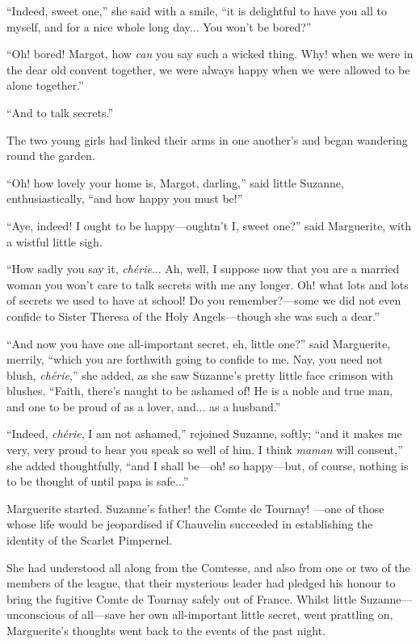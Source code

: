 \enquote{Indeed, sweet one,} she said with a smile, \enquote{it is delightful to have you all to myself, and for a nice whole long day... You won't be bored?}

\enquote{Oh! bored! Margot, how \textit{can} you say such a wicked thing. Why! when we were in the dear old convent together, we were always happy when we were allowed to be alone together.}

\enquote{And to talk secrets.}

The two young girls had linked their arms in one another's and began wandering round the garden.

\enquote{Oh! how lovely your home is, Margot, darling,} said little Suzanne, enthusiastically, \enquote{and how happy you must be!}

\enquote{Aye, indeed! I ought to be happy---oughtn't I, sweet one?} said Marguerite, with a wistful little sigh.

\enquote{How sadly you say it, \textit{chérie}... Ah, well, I suppose now that you are a married woman you won't care to talk secrets with me any longer. Oh! what lots and lots of secrets we used to have at school! Do you remember?---some we did not even confide to Sister Theresa of the Holy Angels---though she was such a dear.}

\enquote{And now you have one all-important secret, eh, little one?} said Marguerite, merrily, \enquote{which you are forthwith going to confide to me. Nay, you need not blush, \textit{chérie},} she added, as she saw Suzanne's pretty little face crimson with blushes. \enquote{Faith, there's naught to be ashamed of! He is a noble and true man, and one to be proud of as a lover, and... as a husband.}

\enquote{Indeed, \textit{chérie}, I am not ashamed,} rejoined Suzanne, softly; \enquote{and it makes me very, very proud to hear you speak so well of him. I think \textit{maman} will consent,} she added thoughtfully, \enquote{and I shall be---oh! so happy---but, of course, nothing is to be thought of until papa is safe...}

Marguerite started. Suzanne's father! the Comte de Tournay! ---one of those whose life would be jeopardised if Chauvelin succeeded in establishing the identity of the Scarlet Pimpernel.

She had understood all along from the Comtesse, and also from one or two of the members of the league, that their mysterious leader had pledged his honour to bring the fugitive Comte de Tournay safely out of France. Whilst little Suzanne---unconscious of all---save her own  all-important little secret, went prattling on, Marguerite's thoughts went back to the events of the past night.

